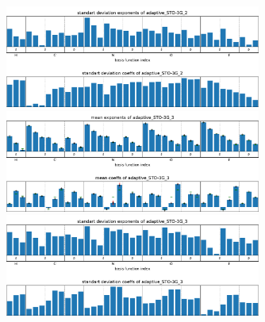\begin{figure}
    \includegraphics[width=0.75\textwidth]{chapters/results/results_images/adaptive_basis_functions/std_exps_and_coeffsadaptive_STO-3G_2}
    \includegraphics[width=0.75\textwidth]{chapters/results/results_images/adaptive_basis_functions/mean_exps_and_coeffsadaptive_STO-3G_3}
    \includegraphics[width=0.75\textwidth]{chapters/results/results_images/adaptive_basis_functions/std_exps_and_coeffsadaptive_STO-3G_3}
\end{figure}

